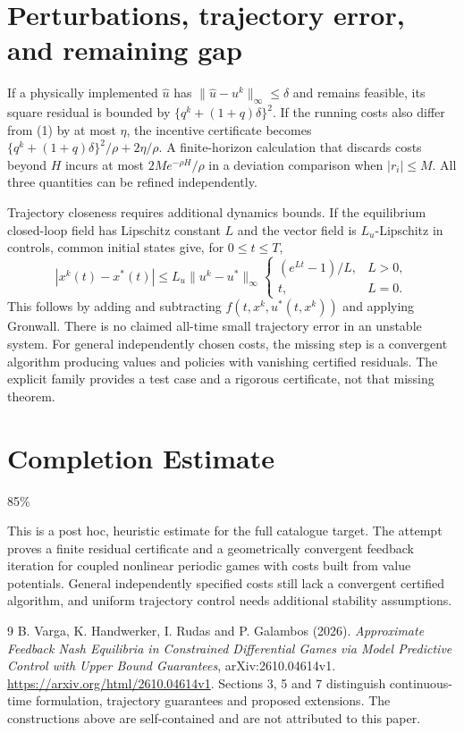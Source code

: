 \documentclass[11pt]{article}
\theoremstyle{definition}
\begin{document}
\section*{Perturbations, trajectory error, and remaining gap}
If a physically implemented $\widehat u$ has
$\|\widehat u-u^k\|_\infty\le\delta$ and remains feasible, its square residual
is bounded by $\{q^k+(1+q)\delta\}^2$. If the running costs also differ from
(1) by at most $\eta$, the incentive certificate becomes
$\{q^k+(1+q)\delta\}^2/\rho+2\eta/\rho$.
A finite-horizon calculation that discards costs beyond $H$ incurs at most
$2M e^{-\rho H}/\rho$ in a deviation comparison when $|r_i|\le M$.
All three quantities can be refined independently.

Trajectory closeness requires additional dynamics bounds. If the equilibrium
closed-loop field has Lipschitz constant $L$ and the vector field is
$L_u$-Lipschitz in controls, common initial states give, for $0\le t\le T$,
\[
 |x^k(t)-x^*(t)|\le L_u\|u^k-u^*\|_\infty
 \begin{cases}(e^{Lt}-1)/L,&L>0,\\t,&L=0.\end{cases}
\]
This follows by adding and subtracting $f(t,x^k,u^*(t,x^k))$ and applying
Gronwall. There is no claimed all-time small trajectory error in an unstable
system. For general independently chosen costs, the missing step is a
convergent algorithm producing values and policies with vanishing certified
residuals. The explicit family provides a test case and a rigorous certificate,
not that missing theorem.

\section{Completion Estimate}
85\%

This is a post hoc, heuristic estimate for the full catalogue target.
The attempt proves a finite residual certificate and a geometrically convergent feedback iteration for coupled nonlinear periodic games with costs built from value potentials. General independently specified costs still lack a convergent certified algorithm, and uniform trajectory control needs additional stability assumptions.

\begin{thebibliography}{9}
 B. Varga, K. Handwerker, I. Rudas and P. Galambos (2026).
\emph{Approximate Feedback Nash Equilibria in Constrained Differential Games
via Model Predictive Control with Upper Bound Guarantees}, arXiv:2610.04614v1.
\url{https://arxiv.org/html/2610.04614v1}. Sections 3, 5 and 7 distinguish
continuous-time formulation, trajectory guarantees and proposed extensions.
The constructions above are self-contained and are not attributed to this paper.
\end{thebibliography}
\end{document}
